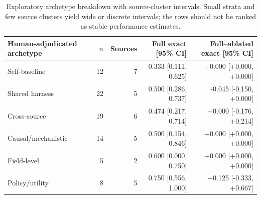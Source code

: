 \begin{table}[t]
\centering
\small
\setlength{\tabcolsep}{6pt}
\begin{tabular}{lrrrr}
\toprule
\textbf{Human-adjudicated archetype} & \textbf{$n$} &
\textbf{Sources} & \textbf{Full exact [95\% CI]} &
\textbf{Full--ablated exact [95\% CI]} \\
\midrule
Self-baseline & 12 & 7 & 0.333 [0.111, 0.625] & +0.000 [+0.000, +0.000] \\
Shared harness & 22 & 5 & 0.500 [0.286, 0.737] & -0.045 [-0.150, +0.000] \\
Cross-source & 19 & 6 & 0.474 [0.217, 0.714] & +0.000 [-0.176, +0.214] \\
Causal/mechanistic & 14 & 5 & 0.500 [0.154, 0.846] & +0.000 [+0.000, +0.000] \\
Field-level & 5 & 2 & 0.600 [0.000, 0.750] & +0.000 [+0.000, +0.000] \\
Policy/utility & 8 & 5 & 0.750 [0.556, 1.000] & +0.125 [-0.333, +0.667] \\
\bottomrule
\end{tabular}
\caption{Exploratory archetype breakdown with source-cluster intervals.
Small strata and few source clusters yield wide or discrete intervals; the
rows should not be ranked as stable performance estimates.}
\label{tab:rule-reliability-by-archetype}
\end{table}
